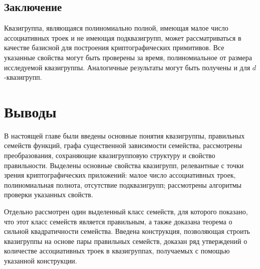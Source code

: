 \subsection{Заключение}

    Квазигруппа, являющаяся полиномиально полной, имеющая малое число ассоциативных троек и не имеющая подквазигрупп, может рассматриваться в качестве базисной для построения криптографических примитивов.
    Все указанные свойства могут быть проверены за время, полиномиальное от размера исследуемой квазигруппы.
    Аналогичные результаты могут быть получены и для $d$-квазигрупп.


\section*{Выводы}

    В настоящей главе были введены основные понятия квазигруппы, правильных семейств функций, графа существенной зависимости семейства, рассмотрены преобразования, сохраняющие квазигрупповую структуру и свойство правильности.
    Выделены основные свойства квазигрупп, релевантные с точки зрения криптографических приложений: малое число ассоциативных троек, полиномиальная полнота, отсутствие подквазигрупп; рассмотрены алгоритмы проверки указанных свойств.

    Отдельно рассмотрен один выделенный класс семейств, для которого показано, что этот класс семейств является правильным, а также доказана теорема о сильной квадратичности семейства.
    Введена конструкция, позволяющая строить квазигруппы на основе пары правильных семейств, доказан ряд утверждений о количестве ассоциативных троек в квазигруппах, получаемых с помощью указанной конструкции.